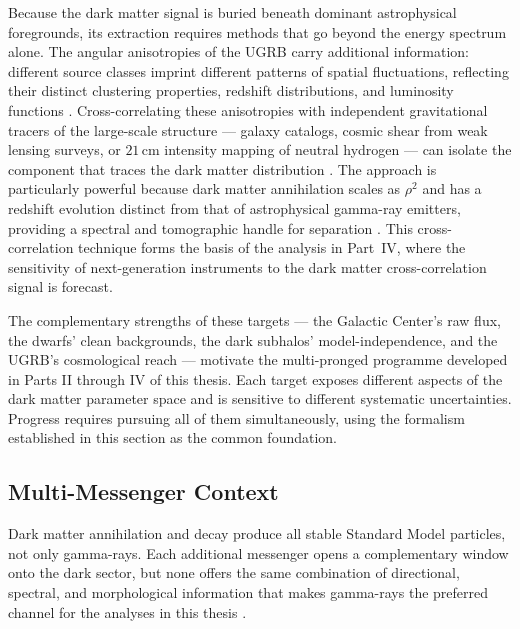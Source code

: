 Because the dark matter signal is buried beneath dominant astrophysical foregrounds, its extraction requires methods that go beyond the energy spectrum alone.
The angular anisotropies of the UGRB carry additional information: different source classes imprint different patterns of spatial fluctuations, reflecting their distinct clustering properties, redshift distributions, and luminosity functions \cite{DGRB-review}.
Cross-correlating these anisotropies with independent gravitational tracers of the large-scale structure --- galaxy catalogs, cosmic shear from weak lensing surveys, or $21\,$cm intensity mapping of neutral hydrogen --- can isolate the component that traces the dark matter distribution \cite{DGRB-review,Pinetti:2021jjs,Cirelli:2024ssz}.
The approach is particularly powerful because dark matter annihilation scales as $\rho^2$ and has a redshift evolution distinct from that of astrophysical gamma-ray emitters, providing a spectral and tomographic handle for separation \cite{Pinetti:2021jjs}.
This cross-correlation technique forms the basis of the analysis in Part~IV, where the sensitivity of next-generation instruments to the dark matter cross-correlation signal is forecast.

The complementary strengths of these targets --- the Galactic Center's raw flux, the dwarfs' clean backgrounds, the dark subhalos' model-independence, and the UGRB's cosmological reach --- motivate the multi-pronged programme developed in Parts II through IV of this thesis.
Each target exposes different aspects of the dark matter parameter space and is sensitive to different systematic uncertainties.
Progress requires pursuing all of them simultaneously, using the formalism established in this section as the common foundation.

\subsection{Multi-Messenger Context}
\label{sec:multi_messenger}

Dark matter annihilation and decay produce all stable Standard Model particles, not only gamma-rays.
Each additional messenger opens a complementary window onto the dark sector, but none offers the same combination of directional, spectral, and morphological information that makes gamma-rays the preferred channel for the analyses in this thesis \cite{Cirelli:2024ssz}.

